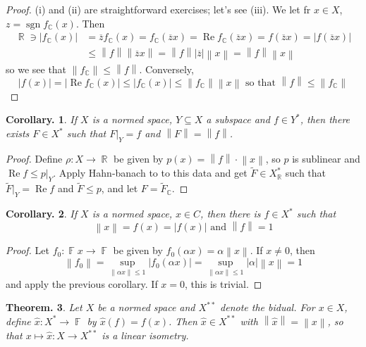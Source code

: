 \documentclass[11pt, a4paper]{memoir}
\DeclareMathOperator{\R}{{\mathbb{R}}}
\DeclareMathOperator{\C}{{\mathbb{C}}}
\DeclareMathOperator{\F}{{\mathbb{F}}}
\newcommand{\norm}[1]{\ensuremath{\left\lVert#1\right\rVert}}
\theoremstyle{change}
\newtheorem{theorem}{Theorem.}[section]
\newtheorem{corollary}[theorem]{Corollary.}
\theoremstyle{plain}
\theoremstyle{nonumberplain}
\newtheorem{proof}{Proof}
\DeclareMathOperator{\sgn}{sgn}
\renewcommand{\Re}{\ensuremath{\operatorname{Re}}}
\numberwithin{equation}{section}
\begin{document}
\begin{proof}
    (i) and (ii) are straightforward exercises; let's see (iii).
    We let fr $x\in X$, $z=\sgn f_{\C}(x)$.
    Then
    \begin{align*}
        \R\ni|f_{\C}(x)|&=\overline{z}f_{\C}(x)=f_{\C}(\overline{z}x)=\Re f_{\C}(\overline{z}x)=f(\overline{z}x)=|f(\overline{z}x)|\\
                        &\leq\norm{f}\norm{\overline{z}x}=\norm{f}|\overline{z}|\norm{x}=\norm{f}\norm{x}
    \end{align*}
    so we see that $\norm{f_{\C}}\leq\norm{f}$.
    Conversely,
    \begin{equation*}
        |f(x)|=|\Re f_{\C}(x)|\leq|f_{\C}(x)|\leq\norm{f_{\C}}\norm{x}\text{ so that }\norm{f}\leq\norm{f_{\C}}
    \end{equation*}
\end{proof}
\begin{corollary}
    If $X$ is a normed space, $Y\subseteq X$ a subspace and $f\in Y^*$, then there exists $F\in X^*$ such that $F|_{Y}=f$ and $\norm{F}=\norm{f}$.
\end{corollary}
\begin{proof}
    Define $\rho:X\to\R$ be given by $p(x)=\norm{f}\cdot\norm{x}$, so $p$ is sublinear and $\Re f\leq p|_Y$.
    Apply Hahn-banach to to this data and get $\tilde F\in X_{\R}^*$ such that $\tilde F|_Y=\Re f$ and $\tilde F\leq p$, and let $F=\tilde F_{\C}$.
\end{proof}
\begin{corollary}
    If $X$ is a normed space, $x\in C$, then there is $f\in X^*$ such that
    \begin{equation*}
        \norm{x}=f(x)=|f(x)|\text{ and }\norm{f}=1
    \end{equation*}
\end{corollary}
\begin{proof}
    Let $f_0:\F x\to\F$ be given by $f_0(\alpha x)=\alpha\norm{x}$.
    If $x\neq 0$, then
    \begin{equation*}
        \norm{f_0}=\sup_{\norm{\alpha x}\leq 1}|f_0(\alpha x)|=\sup_{\norm{\alpha x}\leq 1}|\alpha|\norm{x}=1
    \end{equation*}
    and apply the previous corollary.
    If $x=0$, this is trivial.
\end{proof}
\begin{theorem}
    Let $X$ be a normed space and $X^{**}$ denote the bidual.
    For $x\in X$, define $\hat x:X^*\to\F$ by $\hat x(f)=f(x)$.
    Then $\hat x\in X^{**}$ with $\norm{\hat x}=\norm{x}$, so that $x\mapsto\hat x:X\to X^{**}$ is a linear isometry.
\end{theorem}
\end{document}

